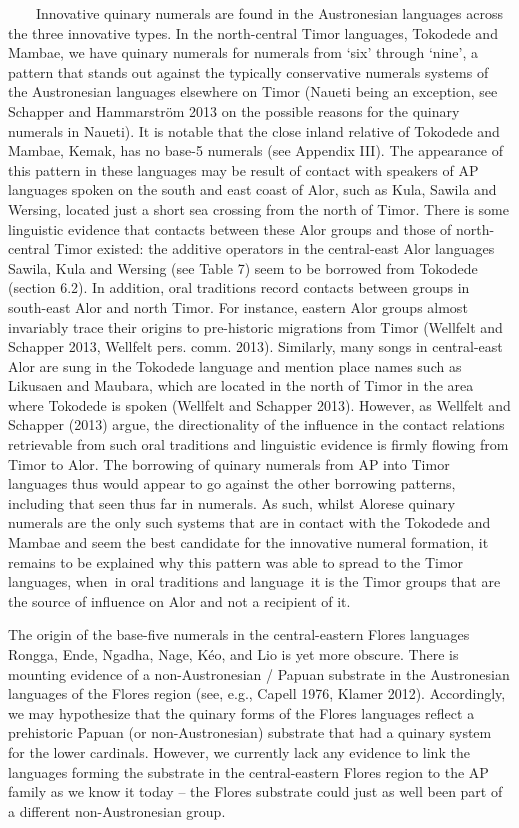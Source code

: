 \ \ \ \ Innovative quinary numerals are found in the Austronesian languages across the three innovative types. In the north-central Timor languages, Tokodede and Mambae, we have quinary numerals for numerals from {\textquoteleft}six{\textquoteright} through {\textquoteleft}nine{\textquoteright}, a pattern that stands out against the typically conservative numerals systems of the Austronesian languages elsewhere on Timor (Naueti being an exception, see Schapper and Hammarstr\"om 2013 on the possible reasons for the quinary numerals in Naueti). It is notable that the close inland relative of Tokodede and Mambae, Kemak, has no base-5 numerals (see Appendix III). The appearance of this pattern in these languages may be result of contact with speakers of AP languages spoken on the south and east coast of Alor, such as Kula, Sawila and Wersing, located just a short sea crossing from the north of Timor. There is some linguistic evidence that contacts between these Alor groups and those of north-central Timor 
existed: the additive operators in the central-east Alor languages Sawila, Kula and Wersing (see Table 7) seem to be borrowed from Tokodede (section 6.2). In addition, oral traditions record contacts between groups in south-east Alor and north Timor. For instance, eastern Alor groups almost invariably trace their origins to pre-historic migrations from Timor (Wellfelt and Schapper 2013, Wellfelt pers. comm. 2013). Similarly, many songs in central-east Alor are sung in the Tokodede language and mention place names such as Likusaen and Maubara, which are located in the north of Timor in the area where Tokodede is spoken (Wellfelt and Schapper 2013). However, as Wellfelt and Schapper (2013) argue, the directionality of the influence in the contact relations retrievable from such oral traditions and linguistic evidence is firmly flowing from Timor to Alor. The borrowing of quinary numerals from AP into Timor languages thus would appear to go against the other borrowing patterns, including that seen thus far in 
numerals. As such, whilst Alorese quinary numerals are the only such systems that are in contact with the Tokodede and Mambae and seem the best candidate for the innovative numeral formation, it remains to be explained why this pattern was able to spread to the Timor languages, when~in oral traditions and language~it is the Timor groups that are the source of influence on Alor and not a recipient of it.

The origin of the base-five numerals in the central-eastern Flores languages Rongga, Ende, Ngadha, Nage, K\'eo, and Lio is yet more obscure. There is mounting evidence of a non-Austronesian / Papuan substrate in the Austronesian languages of the Flores region (see, e.g., Capell 1976, Klamer 2012). Accordingly, we may hypothesize that the quinary forms of the Flores languages reflect a prehistoric Papuan (or non-Austronesian) substrate that had a quinary system for the lower cardinals. However, we currently lack any evidence to link the languages forming the substrate in the central-eastern Flores region to the AP family as we know it today -- the Flores substrate could just as well been part of a different non-Austronesian group. 

